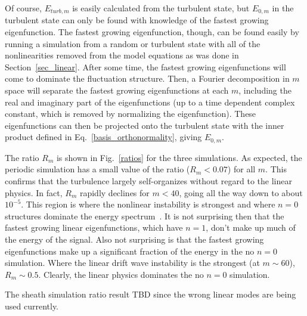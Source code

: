 \documentclass[showpacs,preprintnumbers,amsmath,amssymb,superscriptaddress,aip]{revtex4-1}
\begin{document}
Of course, $E_{turb,m}$ is easily calculated from the turbulent state, but $E_{0,m}$ in the 
turbulent state can only be found with knowledge of the fastest growing eigenfunction. The fastest growing eigenfunction, though, can be found easily by running a simulation from a random 
or turbulent state with all of the nonlinearities removed from the model equations as was done in Section~\ref{sec_linear}. After some time, the fastest growing eigenfunctions will come to
dominate the fluctuation structure. Then, a Fourier decomposition in $m$ space will separate the fastest growing eigenfunctions at each $m$, including the real and imaginary part
of the eigenfunctions (up to a time dependent complex constant, which is removed by normalizing the eigenfunction). These eigenfunctions can then be projected onto the turbulent state
with the inner product defined in Eq.~\ref{basis_orthonormality}, giving $E_{0,m}$.

The ratio $R_m$ is shown in Fig.~\ref{ratios} for the three simulations. As expected, the periodic simulation has a small value of the ratio ($R_m < 0.07$) for all $m$. 
This confirms that the turbulence largely self-organizes
without regard to the linear physics. In fact, $R_m$ rapidly declines for $m<40$, going all the way down to about $10^{-5}$. This region is where the nonlinear instability is strongest and where
$n=0$ structures dominate the energy spectrum~\cite{friedman2012b}. It is not surprising then that the fastest growing linear eigenfunctions, which have $n=1$,
don't make up much of the energy of the signal.
Also not surprising is that the fastest growing eigenfunctions make up a significant fraction of the energy in the no $n=0$ simulation. Where the linear drift wave instability is the strongest
(at $m \sim 60$), $R_m \sim 0.5$. Clearly, the linear physics dominates the no $n=0$ simulation.

The sheath simulation ratio result TBD since the wrong linear modes are being used currently.
\end{document}
